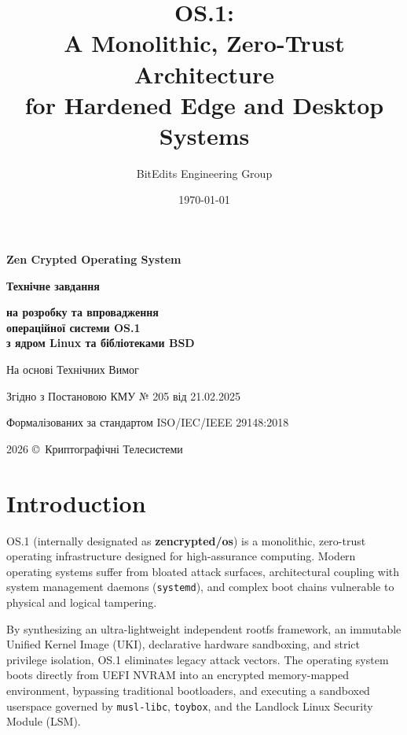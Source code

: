 \documentclass{article}
\title{\textbf{OS.1}: \\
       \Large A Monolithic, Zero-Trust Architecture \\
       for Hardened Edge and Desktop Systems \\ }
\author{BitEdits Engineering Group}
\date{\today}
\newcommand\HUGE[1]{\fontsize{40}{40}\selectfont #1}
\begin{document}
\begin{titlepage}
  \AddToShipoutPictureBG*{\AtPageLowerLeft{\color{nato}\rule{\paperwidth}{\paperheight}}}
  \color{white}\thispagestyle{empty}\vspace*{3cm}\centering
  {\Huge  \textbf{Zen Crypted Operating System} \par} \vspace{1.5cm}
  {\HUGE  \textbf{Технічне завдання} \par} \vspace{1.5cm}
  {\LARGE \textbf{на розробку та впровадження \\ операційної системи OS.1 \\ з ядром Linux та бібліотеками BSD} \par} \vspace{1.5cm}
  {\large На основі Технічних Вимог \par}
  {\large Згідно з Постановою КМУ № 205 від 21.02.2025 \par}
  {\large Формалізованих за стандартом ISO/IEC/IEEE 29148:2018 \par} \vfill
  {\large 2026 \copyright\ Криптографічні Телесистеми \par}
\end{titlepage}

\maketitle
\tableofcontents
\newpage

\section{Introduction}
OS.1 (internally designated as \textbf{zencrypted/os}) is a monolithic, zero-trust operating infrastructure designed for high-assurance computing. Modern operating systems suffer from bloated attack surfaces, architectural coupling with system management daemons (\texttt{systemd}), and complex boot chains vulnerable to physical and logical tampering.

By synthesizing an ultra-lightweight independent rootfs framework, an immutable Unified Kernel Image (UKI), declarative hardware sandboxing, and strict privilege isolation, OS.1 eliminates legacy attack vectors. The operating system boots directly from UEFI NVRAM into an encrypted memory-mapped environment, bypassing traditional bootloaders, and executing a sandboxed userspace governed by \texttt{musl-libc}, \texttt{toybox}, and the Landlock Linux Security Module (LSM).
\end{document}
